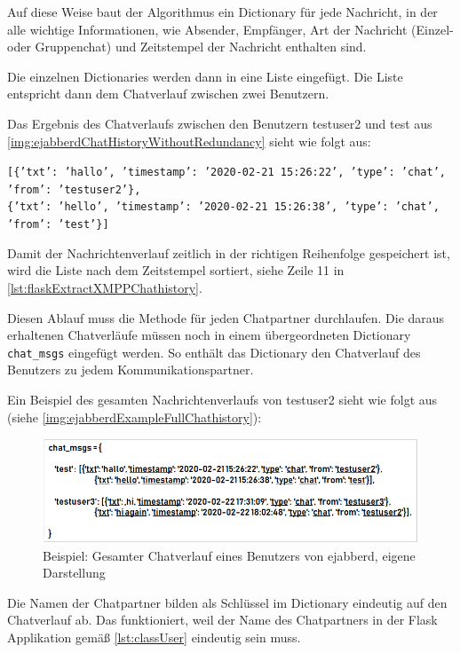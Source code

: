 \documentclass[a4paper,titlepage,halfparskip,12pt]{scrreprt}
\begin{document}
\begin{onehalfspacing}
Auf diese Weise baut der Algorithmus ein Dictionary für jede Nachricht, in der alle wichtige Informationen, wie Absender, Empfänger, Art der Nachricht (Einzel- oder Gruppenchat) und Zeitstempel der Nachricht enthalten sind.

Die einzelnen Dictionaries werden dann in eine Liste eingefügt. Die Liste entspricht dann dem Chatverlauf zwischen zwei Benutzern.

\pagebreak

Das Ergebnis des Chatverlaufs zwischen den Benutzern testuser2 und test aus \autoref{img:ejabberdChatHistoryWithoutRedundancy} sieht wie folgt aus:

\texttt{[\{'txt': 'hallo', 'timestamp': '2020-02-21 15:26:22', 'type': 'chat', 'from': 'testuser2'\},} \\ \texttt{\{'txt': 'hello', 'timestamp': '2020-02-21 15:26:38', 'type': 'chat', 'from': 'test'\}]}

Damit der Nachrichtenverlauf zeitlich in der richtigen Reihenfolge gespeichert ist, wird die Liste nach dem Zeitstempel sortiert, siehe Zeile 11 in \autoref{lst:flaskExtractXMPPChathistory}.

Diesen Ablauf muss die Methode für jeden Chatpartner durchlaufen. Die daraus erhaltenen Chatverläufe müssen noch in einem übergeordneten Dictionary \texttt{chat\_msgs} eingefügt werden. So enthält das Dictionary den Chatverlauf des Benutzers zu jedem Kommunikationspartner.

Ein Beispiel des gesamten Nachrichtenverlaufs von testuser2 sieht wie folgt aus (siehe \autoref{img:ejabberdExampleFullChathistory}):

\begin{figure}[h]
	\centering
	\includegraphics[width=\textwidth]{images/ejabberdExampleFullChathistory}
	\caption{Beispiel: Gesamter Chatverlauf eines Benutzers von ejabberd, eigene Darstellung}
	\label{img:ejabberdExampleFullChathistory}
\end{figure}

Die Namen der Chatpartner bilden als Schlüssel im Dictionary eindeutig auf den Chatverlauf ab. Das funktioniert, weil der Name des Chatpartners in der Flask Applikation gemäß \autoref{lst:classUser} eindeutig sein muss.


\end{onehalfspacing}
\end{document}
